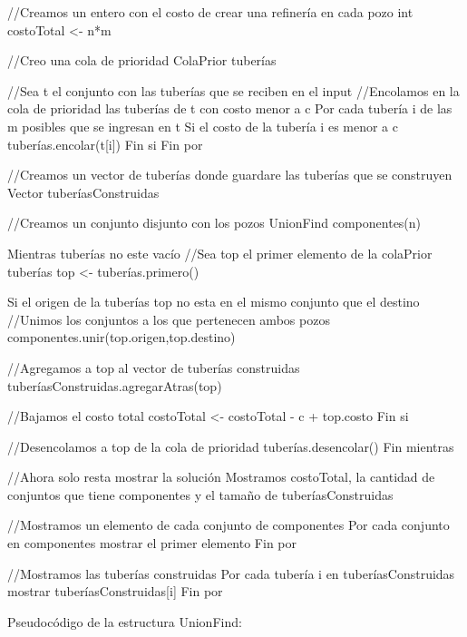 \begin{codesnippet}
//Creamos un entero con el costo de crear una refinería en cada pozo
int costoTotal <- n*m

//Creo una cola de prioridad
ColaPrior tuberías

//Sea t el conjunto con las tuberías que se reciben en el input
//Encolamos en la cola de prioridad las tuberías de t con costo menor a c
Por cada tubería i de las m posibles que se ingresan en t
	Si el costo de la tubería i es menor a c
    	tuberías.encolar(t[i])
    Fin si
Fin por

//Creamos un vector de tuberías donde guardare las tuberías que se construyen
Vector tuberíasConstruidas

//Creamos un conjunto disjunto con los pozos
UnionFind componentes(n)

Mientras tuberías no este vacío
  //Sea top el primer elemento de la colaPrior tuberías
  	top <- tuberías.primero()

    Si el origen de la tuberías top no esta en el mismo conjunto que el destino
      //Unimos los conjuntos a los que pertenecen ambos pozos
        componentes.unir(top.origen,top.destino)

        //Agregamos a top al vector de tuberías construidas
        tuberíasConstruidas.agregarAtras(top)

        //Bajamos el costo total
        costoTotal <- costoTotal - c + top.costo
    Fin si

    //Desencolamos a top de la cola de prioridad
    tuberías.desencolar()
Fin mientras

//Ahora solo resta mostrar la solución
Mostramos costoTotal, la cantidad de conjuntos que tiene componentes y
el tamaño de tuberíasConstruidas

//Mostramos un elemento de cada conjunto de componentes
Por cada conjunto en componentes
	mostrar el primer elemento
Fin por

//Mostramos las tuberías construidas
Por cada tubería i en tuberíasConstruidas
	mostrar tuberíasConstruidas[i]
Fin por
\end{codesnippet}
Pseudocódigo de la estructura UnionFind: \\

